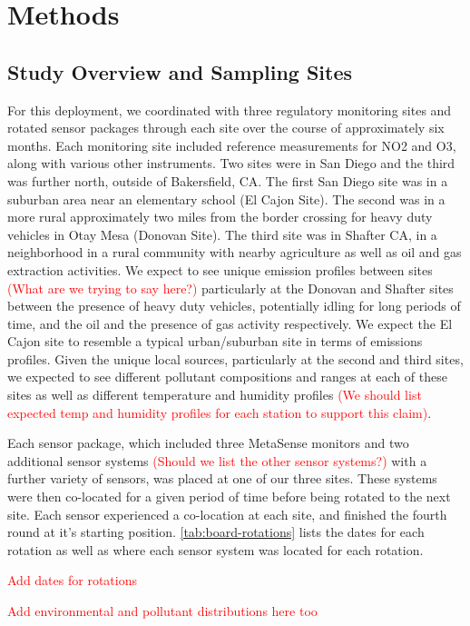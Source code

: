 \documentclass[journal abbreviation, manuscript]{copernicus}
\newcommand\todo[1]{\textcolor{red}{#1}}
\begin{document}
\section{Methods}

\subsection{Study Overview and Sampling Sites}
For this deployment, we coordinated with three regulatory monitoring sites and rotated sensor packages through each site over the course of approximately six months. Each monitoring site included reference measurements for NO2 and O3, along with various other instruments. Two sites were in San Diego and the third was further north, outside of Bakersfield, CA. The first San Diego site was in a suburban area near an elementary school (El Cajon Site). The second was in a more rural approximately two miles from the border crossing for heavy duty vehicles in Otay Mesa (Donovan Site). The third site was in Shafter CA, in a neighborhood in a rural community with nearby agriculture as well as oil and gas extraction activities. We expect to see unique emission profiles between sites \todo{(What are we trying to say here?)} particularly at the Donovan and Shafter sites between the presence of heavy duty vehicles, potentially idling for long periods of time, and the oil and the presence of gas activity respectively. We expect the El Cajon site to resemble a typical urban/suburban site in terms of emissions profiles.  Given the unique local sources, particularly at the second and third sites, we expected to see different pollutant compositions and ranges at each of these sites as well as different temperature and humidity profiles \todo{(We should list expected temp and humidity profiles for each station to support this claim)}.

Each sensor package, which included three MetaSense monitors and two additional sensor systems \todo{(Should we list the other sensor systems?)} with a further variety of sensors, was placed at one of our three sites. These systems were then co-located for a given period of time before being rotated to the next site. Each sensor experienced a co-location at each site, and finished the fourth round at it’s starting position. \autoref{tab:board-rotations} lists the dates for each rotation as well as where each sensor system was located for each rotation. 

\todo{Add dates for rotations}

\todo{Add environmental and pollutant distributions here too}
\end{document}
